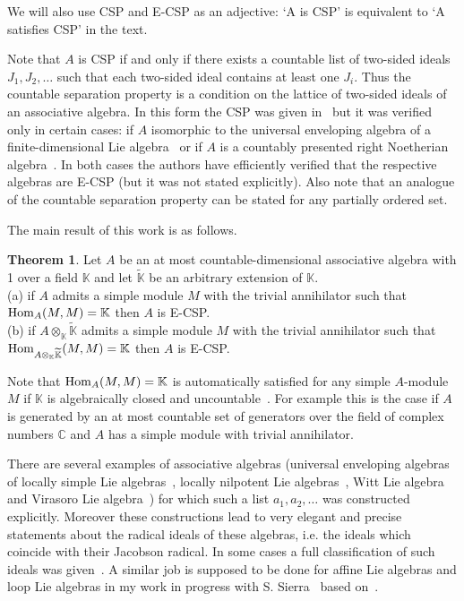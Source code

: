 \documentclass{amsart} \textwidth=18.0cm \oddsidemargin=-1cm \evensidemargin=-1cm \topmargin=-1cm \textheight=23cm
\theoremstyle{definition}
\newtheorem{theorem}{Theorem}
\begin{document}
We will also use CSP and E-CSP as an adjective: `A is CSP' is equivalent to `A satisfies CSP' in the text. 


Note that $A$ is CSP if and only if there exists a countable list of two-sided ideals $J_1, J_2,\ldots$ such that each two-sided ideal contains at least one $J_i$. 
Thus the countable separation property is a condition on the lattice of two-sided ideals of an associative algebra. 
In this form the CSP was given in~\cite{I, Dix2} but it was verified only in certain cases: if $A$ isomorphic to the universal enveloping algebra of a finite-dimensional Lie algebra~\cite{Dix2} or if $A$ is a countably presented right Noetherian algebra~\cite{I}. 
In both cases the authors have efficiently verified that the respective algebras are E-CSP (but it was not stated explicitly). 
Also note that an analogue of the countable separation property can be stated for any partially ordered set.

The main result of this work is as follows.
\begin{theorem}\label{T:stab} Let $A$ be an at most countable-dimensional associative algebra with 1 over a field $\mathbb K$ and let $\widetilde{\mathbb K}$ be an arbitrary extension of $\mathbb K$. \\
(a) if $A$ admits a simple module $M$ with the trivial annihilator such that ${\rm Hom}_{A}(M, M)=\mathbb K$ then $A$ is E-CSP.\\
(b) if $A\otimes_{\mathbb K}{\widetilde{\mathbb K}}$ admits a simple module $M$ with the trivial annihilator such that  ${\rm Hom}_{A\otimes_{\mathbb K}{\widetilde{\mathbb K}}}(M, M)=\mathbb K$ then $A$ is E-CSP.
\end{theorem}

Note that ${\rm Hom}_{A}(M, M)=\mathbb K$ is automatically satisfied for any simple $A$-module $M$ if $\mathbb K$ is algebraically closed and uncountable~\cite[Proposition, Section~1.7, Chapter~9]{MR}. 
For example this is the case if $A$ is generated by an at most countable set of generators over the field of complex numbers $\mathbb C$ and $A$ has a simple module with trivial annihilator. 

There are several examples of associative algebras (universal enveloping algebras of locally simple Lie algebras~\cite{PP1, PP2, PP3}, locally nilpotent Lie algebras~\cite{IP}, Witt Lie algebra and Virasoro Lie algebra~\cite{PS1, PS2}) for which such a list $a_1, a_2, \ldots$ was constructed explicitly. 
Moreover these constructions lead to very elegant and precise statements about the radical ideals of these algebras, i.e. the ideals which coincide with their Jacobson radical. In some cases a full classification of such ideals was given~\cite{PP3}. 
A similar job is supposed to be done for affine Lie algebras and loop Lie algebras in my work in progress with S. Sierra~\cite{PS3} based on~\cite{BS}.
\end{document}
